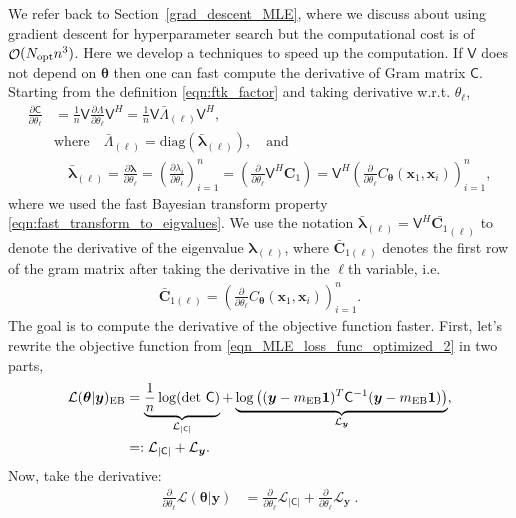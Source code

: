 \documentclass{iitthesis}          %
\DeclareMathOperator{\Order}{{\mathcal O}}
\newcommand{\bm}[1]{\boldsymbol{#1}}
\newcommand{\vlambda}{{\bm{\lambda}}}
\newcommand{\vtheta}{{\bm{\theta}}}
\newcommand{\vC}{\bm{C}}
\newcommand{\vx}{\bm{x}}
\newcommand{\vy}{\bm{y}}
\newcommand{\vone}{\bm{1}}
\newcommand{\mC}{\mathsf{C}}
\newcommand{\mCInv}{{\mathsf{C}^{-1}}}
\newcommand{\mLambda}{\mathsf{\Lambda}}
\newcommand{\mV}{\mathsf{V}}
\newcommand{\MLE}{\textup{EB}}
\newcommand{\opt}{\textup{opt}}
\newcommand{\diag}{\text{diag}}
\def\abs#1{\ensuremath{\left \lvert #1 \right \rvert}}
\begin{document}
 \label{deriv_obj_func_MLE} 
We refer back to Section~\ref{grad_descent_MLE}, where we discuss about using gradient descent for hyperparameter search but the computational cost is of $\Order(N_{\opt} n^3)$. Here we develop a techniques to speed up the computation.
If $\mV$ does not depend on $\vtheta$ then one can fast compute the derivative of Gram matrix $\mC$. Starting from the definition \eqref{eqn:ftk_factor} and taking derivative w.r.t. $\theta_\ell$, 
\begin{align}
\nonumber
\displaystyle \frac{\partial \mC}{\partial \theta_\ell} 
& = \frac 1n \mV \frac{\partial {\mLambda}}{\partial \theta_\ell} \mV^H
= \frac 1n \mV \bar{\mLambda}_{(\ell)} \mV^H,
\\
\nonumber
& \text{where} \quad \bar{\mLambda}_{(\ell)} = \diag(\bar{\vlambda}_{(\ell)}), \quad \text{and}
\\
\label{eqn:deriv_eigenval_gram_matrix}
&  \quad \bar{\vlambda}_{(\ell)} = \frac{\partial \vlambda}{\partial \theta_\ell} = \left( \frac{\partial \lambda_i}{\partial \theta_\ell} \right)_{i=1}^n 
= \left( \frac{\partial }{\partial \theta_\ell} \mV^H {\vC_1} \right)
= \mV^H \left( \frac{\partial }{\partial \theta_\ell} {C_\vtheta(\vx_1,\vx_i)} \right)_{i=1}^n,
\end{align}
where we used the fast Bayesian transform property \eqref{eqn:fast_transform_to_eigvalues}.
We use the notation $\bar{\vlambda}_{(\ell)} = \mV^H \bar{\vC_1}_{(\ell)}$ to denote the derivative of the eigenvalue ${\vlambda}_{(\ell)}$,  where $\bar{\vC}_{1(\ell)}$ denotes the first row of the gram matrix after taking the derivative in the $\ell$th variable, i.e.
\begin{align*}
\bar{\vC}_{1{(\ell)}} = \left(\frac{\partial }{\partial{\theta}_\ell} C_\vtheta(\vx_1,\vx_i) \right)_{i=1}^n.
\end{align*}
The goal is to compute the derivative of the objective function faster. First, let's rewrite the objective function from \eqref{eqn_MLE_loss_func_optimized_2} in two parts,
\begin{align*}
\mathcal{L}(\vtheta | \vy)_{\MLE} &= 
\underbrace{\frac{1}{n}  \log(\det\, \mC)}_{\mathcal{L}_{\abs{\mC}}} + \underbrace{\log\left((\vy-m_\MLE\vone)^T\mCInv(\vy-m_\MLE\vone) \right)}_{\mathcal{L}_{\vy}},
\\ &=: \mathcal{L}_{\abs{\mC}} + \mathcal{L}_{\vy}.
\end{align*}
Now, take the derivative:
\begin{align*}
\frac{\partial}{\partial \theta_\ell} \mathcal{L}(\vtheta | \vy)
&=  \frac{\partial}{\partial \theta_\ell} \mathcal{L}_{\abs{\mC}} + \frac{\partial}{\partial \theta_\ell} \mathcal{L}_{\vy} \;.
\end{align*}
\end{document}
